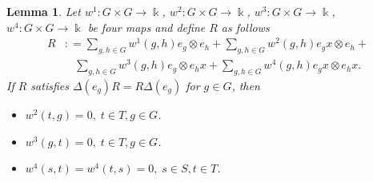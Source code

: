 \documentclass[a4paper,11pt]{amsart}
\numberwithin{equation}{section}
\newtheorem{lemma}[theorem]{Lemma}
\begin{document}
\begin{lemma}\label{lem2.2.4}
Let $w^1:G\times G\rightarrow \Bbbk$, $w^2:G\times G\rightarrow \Bbbk$, $w^3:G\times G\rightarrow \Bbbk$, $w^4:G\times G\rightarrow \Bbbk$ be four maps and define $R$ as follows
\begin{align*}
R&\colon=\sum\limits_{g,h \in G}w^1(g,h)e_{g} \otimes e_{h}+ \sum\limits_{g,h \in G}w^2(g,h)e_{g}x \otimes e_{h}+ \\
&\ \ \ \ \sum\limits_{g,h \in G}w^3(g,h)e_{g} \otimes e_{h}x+\sum\limits_{g,h \in G}w^4(g,h)e_{g}x \otimes e_{h}x.
\end{align*}
If $R$ satisfies $\Delta(e_g)R=R\Delta(e_g)$ for $ g\in G$, then
 \begin{itemize}
  \item[(i)] \label{E} $w^2(t,g)=0,\;t \in T,g\in G$.
  \item[(ii)] \label{F} $w^3(g,t)=0,\;t \in T,g\in G$.
  \item[(iii)] \label{G} $w^4(s,t)=w^4(t,s)=0,\;s \in S,t \in T$.
\end{itemize}
\end{lemma}
\end{document}
